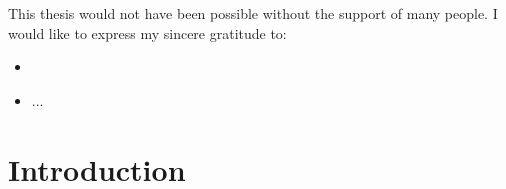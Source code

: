\documentclass[11pt]{report}
\begin{document}
This thesis would not have been possible without the support of many people. I would like to express my sincere gratitude to:


\begin{itemize}
\item 
\item ...
\end{itemize}




\chapter{Introduction}
\end{document}
